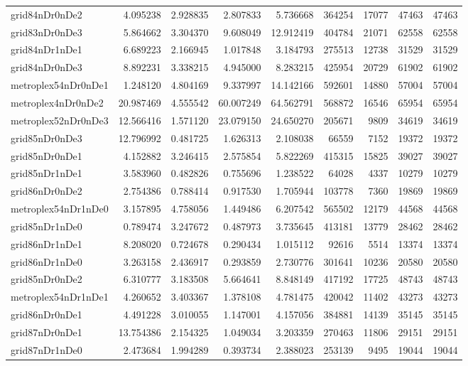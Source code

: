 \begin{longtable}{|l|r|r|r|r|r|r|r|r|}
grid84nDr0nDe2 & 4.095238 & 2.928835 & 2.807833 & 5.736668 & 364254 & 17077 & 47463 & 47463 \\
grid83nDr0nDe3 & 5.864662 & 3.304370 & 9.608049 & 12.912419 & 404784 & 21071 & 62558 & 62558 \\
grid84nDr1nDe1 & 6.689223 & 2.166945 & 1.017848 & 3.184793 & 275513 & 12738 & 31529 & 31529 \\
grid84nDr0nDe3 & 8.892231 & 3.338215 & 4.945000 & 8.283215 & 425954 & 20729 & 61902 & 61902 \\
metroplex54nDr0nDe1 & 1.248120 & 4.804169 & 9.337997 & 14.142166 & 592601 & 14880 & 57004 & 57004 \\
metroplex4nDr0nDe2 & 20.987469 & 4.555542 & 60.007249 & 64.562791 & 568872 & 16546 & 65954 & 65954 \\
metroplex52nDr0nDe3 & 12.566416 & 1.571120 & 23.079150 & 24.650270 & 205671 & 9809 & 34619 & 34619 \\
grid85nDr0nDe3 & 12.796992 & 0.481725 & 1.626313 & 2.108038 & 66559 & 7152 & 19372 & 19372 \\
grid85nDr0nDe1 & 4.152882 & 3.246415 & 2.575854 & 5.822269 & 415315 & 15825 & 39027 & 39027 \\
grid85nDr1nDe1 & 3.583960 & 0.482826 & 0.755696 & 1.238522 & 64028 & 4337 & 10279 & 10279 \\
grid86nDr0nDe2 & 2.754386 & 0.788414 & 0.917530 & 1.705944 & 103778 & 7360 & 19869 & 19869 \\
metroplex54nDr1nDe0 & 3.157895 & 4.758056 & 1.449486 & 6.207542 & 565502 & 12179 & 44568 & 44568 \\
grid85nDr1nDe0 & 0.789474 & 3.247672 & 0.487973 & 3.735645 & 413181 & 13779 & 28462 & 28462 \\
grid86nDr1nDe1 & 8.208020 & 0.724678 & 0.290434 & 1.015112 & 92616 & 5514 & 13374 & 13374 \\
grid86nDr1nDe0 & 3.263158 & 2.436917 & 0.293859 & 2.730776 & 301641 & 10236 & 20580 & 20580 \\
grid85nDr0nDe2 & 6.310777 & 3.183508 & 5.664641 & 8.848149 & 417192 & 17725 & 48743 & 48743 \\
metroplex54nDr1nDe1 & 4.260652 & 3.403367 & 1.378108 & 4.781475 & 420042 & 11402 & 43273 & 43273 \\
grid86nDr0nDe1 & 4.491228 & 3.010055 & 1.147001 & 4.157056 & 384881 & 14139 & 35145 & 35145 \\
grid87nDr0nDe1 & 13.754386 & 2.154325 & 1.049034 & 3.203359 & 270463 & 11806 & 29151 & 29151 \\
grid87nDr1nDe0 & 2.473684 & 1.994289 & 0.393734 & 2.388023 & 253139 & 9495 & 19044 & 19044 \\

\end{longtable}
